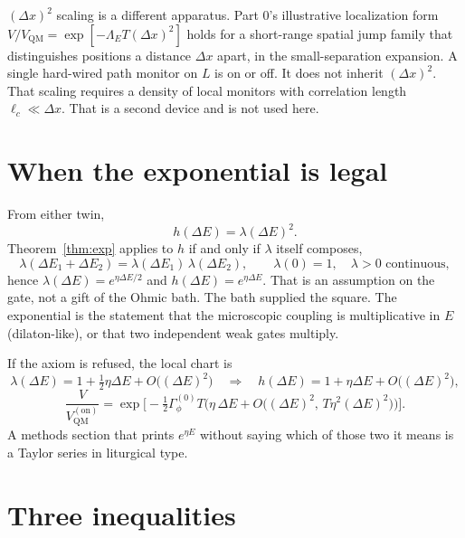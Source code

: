 \documentclass[11pt]{article}
\theoremstyle{definition}
\theoremstyle{plain}
\begin{document}
$(\Delta x)^2$ scaling is a different apparatus. Part 0's illustrative localization form
$V/V_{\mathrm{QM}} = \exp[-\Lambda_E T (\Delta x)^2]$ holds for a short-range spatial jump family that
distinguishes positions a distance $\Delta x$ apart, in the small-separation expansion.\cite{bench} A single
hard-wired path monitor on $L$ is on or off. It does not inherit $(\Delta x)^2$. That scaling requires a
density of local monitors with correlation length $\ell_c \ll \Delta x$. That is a second device and is
not used here.

\section{When the exponential is legal}\label{sec:whenexp}

From either twin,
\begin{equation}
h(\Delta E) = \lambda(\Delta E)^2.
\label{eq:hlambda}
\end{equation}
Theorem~\ref{thm:exp} applies to $h$ if and only if $\lambda$ itself composes,
\begin{equation}
\lambda(\Delta E_1 + \Delta E_2) = \lambda(\Delta E_1)\,\lambda(\Delta E_2), \qquad \lambda(0) = 1, \quad \lambda > 0 \text{ continuous},
\label{eq:lambdacomp}
\end{equation}
hence $\lambda(\Delta E) = e^{\eta\Delta E/2}$ and $h(\Delta E) = e^{\eta\Delta E}$. That is an assumption on
the gate, not a gift of the Ohmic bath. The bath supplied the square. The exponential is the
statement that the microscopic coupling is multiplicative in $E$ (dilaton-like), or that two independent
weak gates multiply.

If the axiom is refused, the local chart is
\begin{equation}
\lambda(\Delta E) = 1 + \tfrac12 \eta \Delta E + O\big((\Delta E)^2\big) \quad\Longrightarrow\quad h(\Delta E) = 1 + \eta \Delta E + O\big((\Delta E)^2\big),
\label{eq:taylor}
\end{equation}
\begin{equation}
\frac{V}{V_{\mathrm{QM}}^{(\mathrm{on})}} = \exp\!\Big[ -\tfrac12 \Gamma_\phi^{(0)} T \Big( \eta\,\Delta E + O\!\big( (\Delta E)^2,\, T\eta^2(\Delta E)^2 \big) \Big) \Big].
\label{eq:laysmall}
\end{equation}
A methods section that prints $e^{\eta E}$ without saying which of those two it means is a Taylor series
in liturgical type.

\section{Three inequalities}\label{sec:ineq}
\end{document}
